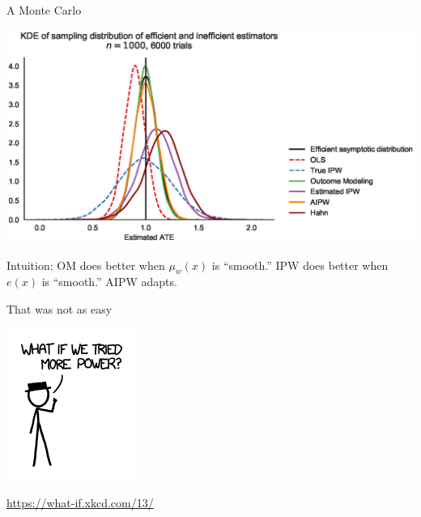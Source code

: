 \documentclass[10pt,aspectratio=169,handout]{beamer}
\theoremstyle{definition}
\begin{document}
\begin{frame}{A Monte Carlo}

  
  \begin{center}
    \includegraphics[height=0.8\textheight]{estimators.eps}
  \end{center}
  \scriptsize
  Intuition: OM does better when $\mu_w(x)$ is ``smooth.'' IPW does better
  when $e(x)$ is ``smooth.'' AIPW adapts. 
  
\end{frame}

\begin{frame}{That was not as easy}
  \begin{center}
  \includegraphics[height=0.3\textheight]{laser_pointer_more_power.png}
  
  \url{https://what-if.xkcd.com/13/}
\end{center}
\end{frame}
\end{document}
